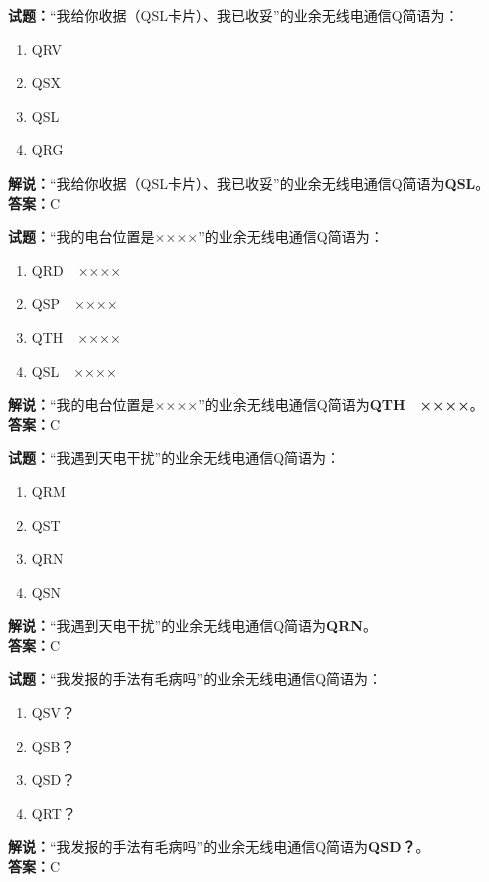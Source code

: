 \documentclass{ctexbook}
\begin{document}
\vspace{1em}

\textbf{试题：}“我给你收据（QSL卡片）、我已收妥”的业余无线电通信Q简语为：
\begin{enumerate}[leftmargin=3em]
  \item QRV
  \item QSX
  \item QSL
  \item QRG
\end{enumerate}
\noindent\textbf{解说：}“我给你收据（QSL卡片）、我已收妥”的业余无线电通信Q简语为\textbf{QSL}。\\\noindent\textbf{答案：}C

\vspace{1em}

\textbf{试题：}“我的电台位置是××××”的业余无线电通信Q简语为：
\begin{enumerate}[leftmargin=3em]
  \item QRD　××××
  \item QSP　××××
  \item QTH　××××
  \item QSL　××××
\end{enumerate}
\noindent\textbf{解说：}“我的电台位置是××××”的业余无线电通信Q简语为\textbf{QTH　××××}。\\\noindent\textbf{答案：}C

\vspace{1em}

\textbf{试题：}“我遇到天电干扰”的业余无线电通信Q简语为：
\begin{enumerate}[leftmargin=3em]
  \item QRM
  \item QST
  \item QRN
  \item QSN
\end{enumerate}
\noindent\textbf{解说：}“我遇到天电干扰”的业余无线电通信Q简语为\textbf{QRN}。\\\noindent\textbf{答案：}C

\vspace{1em}

\textbf{试题：}“我发报的手法有毛病吗”的业余无线电通信Q简语为：
\begin{enumerate}[leftmargin=3em]
  \item QSV？
  \item QSB？
  \item QSD？
  \item QRT？
\end{enumerate}
\noindent\textbf{解说：}“我发报的手法有毛病吗”的业余无线电通信Q简语为\textbf{QSD？}。\\\noindent\textbf{答案：}C
\end{document}
